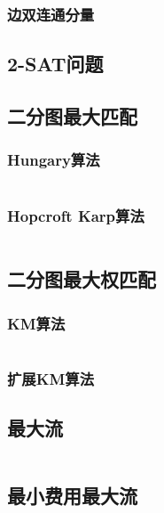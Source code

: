 \documentclass[a4paper]{article}
\newcommand{\cppcode}[1]{
    \inputminted[mathescape]{cpp}{source/#1}
}
\begin{document}
\subsubsection{边双连通分量}

\subsection{2-SAT问题}


\subsection{二分图最大匹配}

\subsubsection{Hungary算法}

\cppcode{graph-theory/maximum-matching-hungary.cpp}

\subsubsection{Hopcroft Karp算法}

\cppcode{graph-theory/maximum-matching-hopcroft-karp.cpp}

\subsection{二分图最大权匹配}

\subsubsection{KM算法}

\cppcode{graph-theory/maximum-weight-matching.cpp}

\subsubsection{扩展KM算法}

\subsection{最大流}

\cppcode{graph-theory/maximum-flow.cpp}

\subsection{最小费用最大流}
\end{document}
